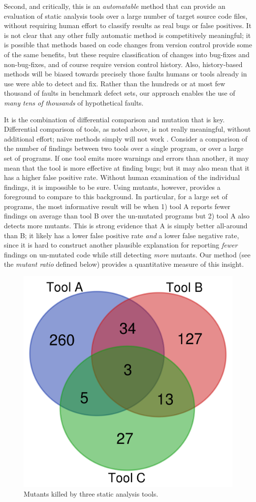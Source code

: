 Second, and critically, this is an \emph{automatable} method that can provide an evaluation of static analysis tools over a large number of target source code files, without requiring human effort to classify results as real bugs or false positives.  It is not clear that any other fully automatic method is competitively meaningful; it is possible that methods based on code changes from version control provide some of the same benefits, but these require classification of changes into bug-fixes and non-bug-fixes, and of course require version control history.  Also, history-based methods will be biased towards precisely those faults humans or tools already in use were able to detect and fix.  Rather than the hundreds \cite{just2014defects4j} or at most few thousand of faults \cite{BugSwarm} in benchmark defect sets, our approach enables the use of \emph{many tens of thousands} of hypothetical faults.

It is the combination of differential comparison and mutation that is key.  Differential comparison of tools, as noted above, is not really meaningful, without additional effort; na\"ive methods simply will not work \cite{regehrRandom}.  Consider a comparison of the number of findings between two tools over a single program, or over a large set of programs.  If one tool emits more warnings and errors than another, it may mean that the tool is more effective at finding bugs; but it may also mean that it has a higher false positive rate.  Without human examination of the individual findings, it is impossible to be sure.  Using mutants, however, provides a foreground to compare to this background.  In particular, for a large set of programs, the most informative result will be when 1) tool A reports fewer findings on average than tool B over the un-mutated programs but 2) tool A also detects more mutants.  This is strong evidence that A is simply better all-around than B; it likely has a lower false positive rate \emph{and} a lower false negative rate, since it is hard to construct another plausible explanation for reporting \emph{fewer} findings on un-mutated code while still detecting \emph{more} mutants.  Our method (see the \emph{mutant ratio} defined below) provides a quantitative measure of this insight.

\begin{figure}
  \centering
  \includegraphics[width=0.30\columnwidth]{example.png}
  \caption{Mutants killed by three static analysis tools.}
  \label{fig:examplevenn}
\end{figure}

